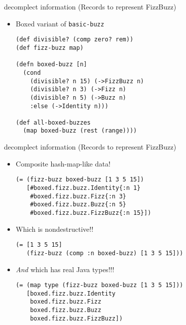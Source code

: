 \documentclass[presentation]{beamer}
\begin{document}
\begin{frame}[label={sec:orgd5c1533},fragile]{decomplect information (Records to represent FizzBuzz)}
 \begin{itemize}
\item Boxed variant of \texttt{basic-buzz}
\begin{verbatim}
(def divisible? (comp zero? rem))
(def fizz-buzz map)

(defn boxed-buzz [n]
  (cond
    (divisible? n 15) (->FizzBuzz n)
    (divisible? n 3) (->Fizz n)
    (divisible? n 5) (->Buzz n)
    :else (->Identity n)))

(def all-boxed-buzzes
  (map boxed-buzz (rest (range))))
\end{verbatim}
\end{itemize}
\end{frame}
\begin{frame}[label={sec:org0ea2c92},fragile]{decomplect information (Records to represent FizzBuzz)}
 \begin{itemize}
\item Composite hash-map-like data!
\begin{verbatim}
(= (fizz-buzz boxed-buzz [1 3 5 15])
   [#boxed.fizz.buzz.Identity{:n 1}
    #boxed.fizz.buzz.Fizz{:n 3}
    #boxed.fizz.buzz.Buzz{:n 5}
    #boxed.fizz.buzz.FizzBuzz{:n 15}])
\end{verbatim}
\item Which is nondestructive!!
\begin{verbatim}
(= [1 3 5 15]
   (fizz-buzz (comp :n boxed-buzz) [1 3 5 15]))
\end{verbatim}
\item \emph{And} which has real Java types!!!
\begin{verbatim}
(= (map type (fizz-buzz boxed-buzz [1 3 5 15]))
   [boxed.fizz.buzz.Identity
    boxed.fizz.buzz.Fizz
    boxed.fizz.buzz.Buzz
    boxed.fizz.buzz.FizzBuzz])
\end{verbatim}
\end{itemize}
\end{frame}
\end{document}
